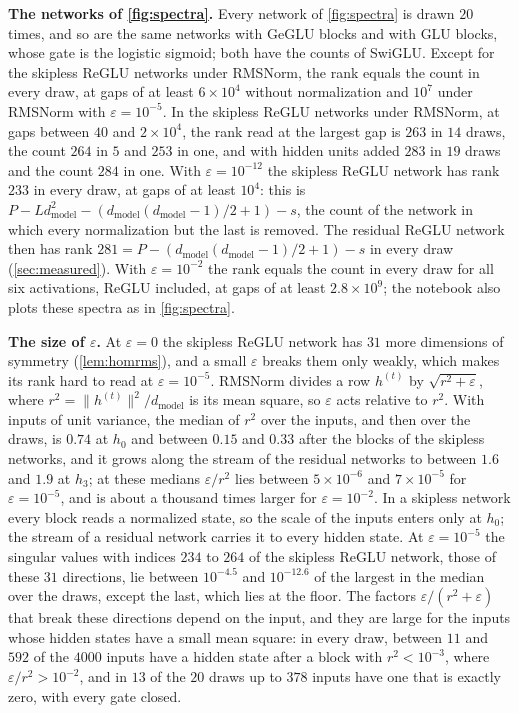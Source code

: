 \documentclass[10pt]{article}
\theoremstyle{definition}
\theoremstyle{remark}
\newcommand{\dm}{d_{\mathrm{model}}}
\newcommand{\norm}[1]{\lVert #1\rVert}
\newcommand{\para}[1]{\smallskip\noindent\textbf{#1}\hspace{0.5em}}
\begin{document}
\para{The networks of \cref{fig:spectra}.} Every network of \cref{fig:spectra} is drawn $20$ times, and so are the same networks with GeGLU blocks and with GLU blocks, whose gate is the logistic sigmoid; both have the counts of SwiGLU. Except for the skipless ReGLU networks under RMSNorm, the rank equals the count in every draw, at gaps of at least $6\times10^{4}$ without normalization and $10^{7}$ under RMSNorm with $\varepsilon = 10^{-5}$. In the skipless ReGLU networks under RMSNorm, at gaps between $40$ and $2\times10^{4}$, the rank read at the largest gap is $263$ in $14$ draws, the count $264$ in $5$ and $253$ in one, and with hidden units added $283$ in $19$ draws and the count $284$ in one. With $\varepsilon = 10^{-12}$ the skipless ReGLU network has rank $233$ in every draw, at gaps of at least $10^4$: this is $P - L\dm^2 - (\dm(\dm-1)/2 + 1) - s$, the count of the network in which every normalization but the last is removed. The residual ReGLU network then has rank $281 = P - (\dm(\dm-1)/2 + 1) - s$ in every draw (\cref{sec:measured}). With $\varepsilon = 10^{-2}$ the rank equals the count in every draw for all six activations, ReGLU included, at gaps of at least $2.8\times10^{9}$; the notebook also plots these spectra as in \cref{fig:spectra}.

\para{The size of $\varepsilon$.} At $\varepsilon = 0$ the skipless ReGLU network has $31$ more dimensions of symmetry (\cref{lem:homrms}), and a small $\varepsilon$ breaks them only weakly, which makes its rank hard to read at $\varepsilon = 10^{-5}$. RMSNorm divides a row $h^{(t)}$ by $\sqrt{r^2 + \varepsilon}$, where $r^2 = \norm{h^{(t)}}^2/\dm$ is its mean square, so $\varepsilon$ acts relative to $r^2$. With inputs of unit variance, the median of $r^2$ over the inputs, and then over the draws, is $0.74$ at $h_0$ and between $0.15$ and $0.33$ after the blocks of the skipless networks, and it grows along the stream of the residual networks to between $1.6$ and $1.9$ at $h_3$; at these medians $\varepsilon/r^2$ lies between $5\times10^{-6}$ and $7\times10^{-5}$ for $\varepsilon = 10^{-5}$, and is about a thousand times larger for $\varepsilon = 10^{-2}$. In a skipless network every block reads a normalized state, so the scale of the inputs enters only at $h_0$; the stream of a residual network carries it to every hidden state. At $\varepsilon = 10^{-5}$ the singular values with indices $234$ to $264$ of the skipless ReGLU network, those of these $31$ directions, lie between $10^{-4.5}$ and $10^{-12.6}$ of the largest in the median over the draws, except the last, which lies at the floor. The factors $\varepsilon/(r^2 + \varepsilon)$ that break these directions depend on the input, and they are large for the inputs whose hidden states have a small mean square: in every draw, between $11$ and $592$ of the $4000$ inputs have a hidden state after a block with $r^2 < 10^{-3}$, where $\varepsilon/r^2 > 10^{-2}$, and in $13$ of the $20$ draws up to $378$ inputs have one that is exactly zero, with every gate closed.
\end{document}

